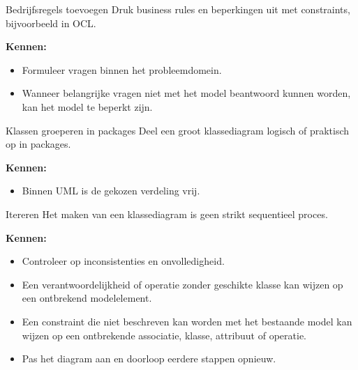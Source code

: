 \documentclass[11pt,a4paper]{article}
\begin{document}
\begin{definition}{Bedrijfsregels toevoegen}
Druk business rules en beperkingen uit met constraints, bijvoorbeeld in OCL.

\textbf{Kennen:}
\begin{itemize}
    \item Formuleer vragen binnen het probleemdomein.
    \item Wanneer belangrijke vragen niet met het model beantwoord kunnen worden, kan het model te beperkt zijn.
\end{itemize}
\end{definition}

\begin{definition}{Klassen groeperen in packages}
Deel een groot klassediagram logisch of praktisch op in packages.

\textbf{Kennen:}
\begin{itemize}
    \item Binnen UML is de gekozen verdeling vrij.
\end{itemize}
\end{definition}

\begin{definition}{Itereren}
Het maken van een klassediagram is geen strikt sequentieel proces.

\textbf{Kennen:}
\begin{itemize}
    \item Controleer op inconsistenties en onvolledigheid.
    \item Een verantwoordelijkheid of operatie zonder geschikte klasse kan wijzen op een ontbrekend modelelement.
    \item Een constraint die niet beschreven kan worden met het bestaande model kan wijzen op een ontbrekende associatie, klasse, attribuut of operatie.
    \item Pas het diagram aan en doorloop eerdere stappen opnieuw.
\end{itemize}
\end{definition}
\end{document}

